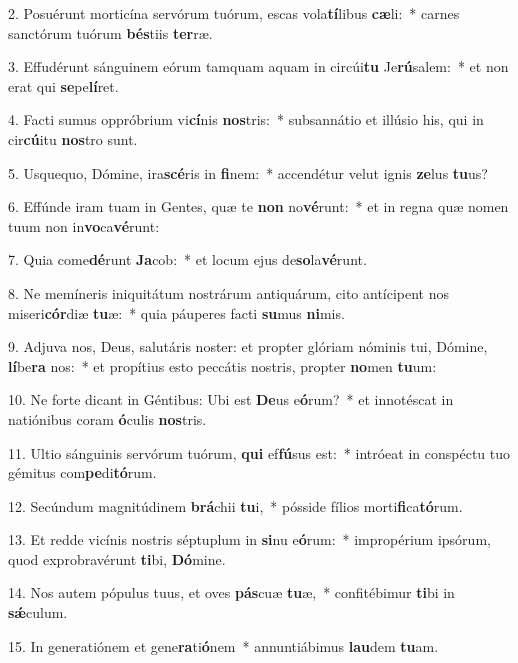 2. Posuérunt morticína servórum tuórum, escas vola\textbf{tí}libus \textbf{cæ}li:~*  carnes sanctórum tuórum \textbf{bés}tiis \textbf{ter}ræ.\

3. Effudérunt sánguinem eórum tamquam aquam in circúi\textbf{tu} Je\textbf{rú}salem:~*  et non erat qui \textbf{se}pe\textbf{lí}ret.\

4. Facti sumus oppróbrium vi\textbf{cí}nis \textbf{nos}tris:~*  subsannátio et illúsio his, qui in cir\textbf{cú}itu \textbf{nos}tro sunt.\

5. Usquequo, Dómine, ira\textbf{scé}ris in \textbf{fi}nem:~*  accendétur velut ignis \textbf{ze}lus \textbf{tu}us?\

6. Effúnde iram tuam in Gentes, quæ te \textbf{non} no\textbf{vé}runt:~*  et in regna quæ nomen tuum non in\textbf{vo}ca\textbf{vé}runt:\

7. Quia come\textbf{dé}runt \textbf{Ja}cob:~*  et locum ejus de\textbf{so}la\textbf{vé}runt.\

8. Ne memíneris iniquitátum nostrárum antiquárum, cito antícipent nos miseri\textbf{cór}diæ \textbf{tu}æ:~*  quia páuperes facti \textbf{su}mus \textbf{ni}mis.\

9. Adjuva nos, Deus, salutáris noster: et propter glóriam nóminis tui, Dómine, \textbf{lí}be\textbf{ra} nos:~*  et propítius esto peccátis nostris, propter \textbf{no}men \textbf{tu}um:\

10. Ne forte dicant in Géntibus: Ubi est \textbf{De}us e\textbf{ó}rum?~*  et innotéscat in natiónibus coram \textbf{ó}culis \textbf{nos}tris.\

11. Ultio sánguinis servórum tuórum, \textbf{qui} ef\textbf{fú}sus est:~*  intróeat in conspéctu tuo gémitus com\textbf{pe}di\textbf{tó}rum.\

12. Secúndum magnitúdinem \textbf{brá}chii \textbf{tu}i,~*  pósside fílios morti\textbf{fi}ca\textbf{tó}rum.\

13. Et redde vicínis nostris séptuplum in \textbf{si}nu e\textbf{ó}rum:~*  impropérium ipsórum, quod exprobravérunt \textbf{ti}bi, \textbf{Dó}mine.\

14. Nos autem pópulus tuus, et oves \textbf{pás}cuæ \textbf{tu}æ,~*  confitébimur \textbf{ti}bi in \textbf{sǽ}culum.\

15. In generatiónem et gene\textbf{ra}ti\textbf{ó}nem~*  annuntiábimus \textbf{lau}dem \textbf{tu}am.\

